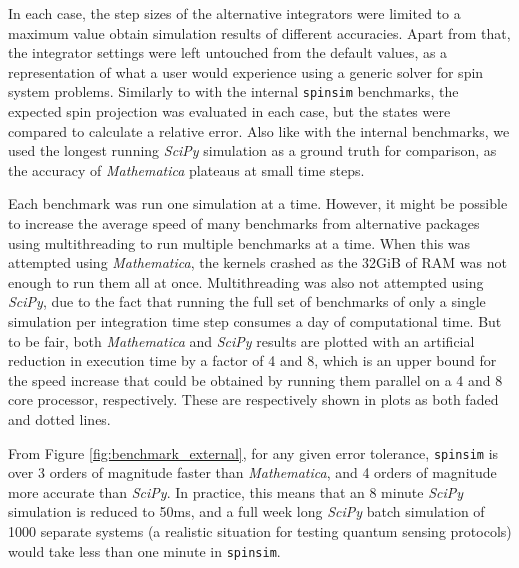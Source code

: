 \documentclass{jors}
\begin{document}
		In each case, the step sizes of the alternative integrators were limited to a maximum value obtain simulation results of different accuracies. Apart from that, the integrator settings were left untouched from the default values, as a representation of what a user would experience using a generic solver for spin system problems. Similarly to with the internal \texttt{spinsim} benchmarks, the expected spin projection was evaluated in each case, but the states were compared to calculate a relative error. Also like with the internal benchmarks, we used the longest running \emph{SciPy} simulation as a ground truth for comparison, as the accuracy of \emph{Mathematica} plateaus at small time steps.

		Each benchmark was run one simulation at a time. However, it might be possible to increase the average speed of many benchmarks from alternative packages using multithreading to run multiple benchmarks at a time. When this was attempted using \emph{Mathematica}, the kernels crashed as the 32GiB of RAM was not enough to run them all at once. Multithreading was also not attempted using \emph{SciPy}, due to the fact that running the full set of benchmarks of only a single simulation per integration time step consumes a day of computational time. But to be fair, both \emph{Mathematica} and \emph{SciPy} results are plotted with an artificial reduction in execution time by a factor of 4 and 8, which is an upper bound for the speed increase that could be obtained by running them parallel on a 4 and 8 core processor, respectively. These are respectively shown in plots as both faded and dotted lines.

		From Figure \ref{fig:benchmark_external}, for any given error tolerance, \texttt{spinsim} is over 3 orders of magnitude faster than \emph{Mathematica}, and 4 orders of magnitude more accurate than \emph{SciPy}. In practice, this means that an 8 minute \emph{SciPy} simulation is reduced to 50ms, and a full week long \emph{SciPy} batch simulation of 1000 separate systems (a realistic situation for testing quantum sensing protocols) would take less than one minute in \texttt{spinsim}.
\end{document}

